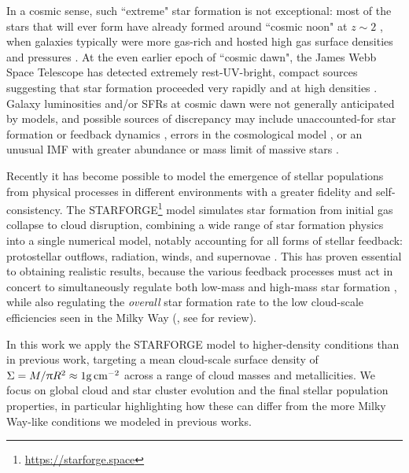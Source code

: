 \documentclass[apjl,twocolumn]{openjournal}
\begin{document}
In a cosmic sense, such ``extreme" star formation is not exceptional: most of the stars that will ever form have already formed around ``cosmic noon" at $z\sim 2$ \citep{2014ARA&A..52..415M}, when galaxies typically were more gas-rich and hosted high gas surface densities and pressures \citep{Swinbank_2011_dense_galaxy_ISM, 2019NatAs...3.1115D,tacconi:2020.cosmic.ism,2020ARA&A..58..661F}. At the even earlier epoch of ``cosmic dawn", the James Webb Space Telescope has detected extremely rest-UV-bright, compact sources suggesting that star formation proceeded very rapidly and at high densities \citep{robertson:2023.hiz.galaxies,labbe:2023.hiz.candidates,2024ApJ...964..150D}. Galaxy luminosities and/or SFRs at cosmic dawn were not generally anticipated by models, and possible sources of discrepancy may include unaccounted-for star formation or feedback dynamics \citep{sun:2023.bursty.sf,dekel:2023.ffb}, errors in the cosmological model \citep{boylankolchin:2023.does.webb.break.lcdm}, or an unusual IMF with greater abundance or mass limit of massive stars \citep{cameron:2023.jwst.topheavy.imf,vink:2023.jwst.nitrogen.vms}.

Recently it has become possible to model the emergence of stellar populations from physical processes in different environments with a greater fidelity and self-consistency. The {\small STARFORGE}\footnote{\url{https://starforge.space}} model simulates star formation from initial gas collapse to cloud disruption, combining a wide range of star formation physics into a single numerical model, notably accounting for all forms of stellar feedback: protostellar outflows, radiation, winds, and supernovae \citep{starforge.methods}. This has proven essential to obtaining realistic results, because the various feedback processes must act in concert to simultaneously regulate both low-mass \citep{wang_2010_jets,Cunningham_2011_outflow_sim,hansen12a,mathew:2021.imf.jets,starforge_jets_imf,lebreuilly:2024.jets.sf} and high-mass star formation \citep{larson:1971.masslimit,wolfire:1987.massive.sf,kuiper_2010_massive_sf,krumholz:2009.massive.sf,rosen:2016.massive.sf,rosen_2020_jets_radiation,rosen_2021_winds,guszejnov:2022.starforge.imf}, while also regulating the {\it overall} star formation rate to the low cloud-scale efficiencies seen in the Milky Way (\citealt{geen:2017, grudic:2018.gmc.sfe, kim:2018.uv.feedback,evans:2021.virial.sfe,starforge.fullphysics}, see \citealt{chevance:2023.gmc.review} for review).

In this work we apply the {\small STARFORGE} model to higher-density conditions than in previous work, targeting a mean cloud-scale surface density of $\Sigma = M/\uppi R^2 \approx 1 \rm g\,cm^{-2}$ across a range of cloud masses and metallicities. We focus on global cloud and star cluster evolution and the final stellar population properties, in particular highlighting how these can differ from the more Milky Way-like conditions we modeled in previous works. 
\end{document}
